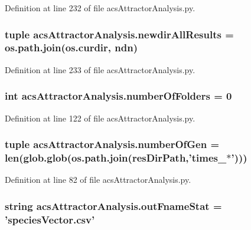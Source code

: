 Definition at line 232 of file acs\-Attractor\-Analysis.\-py.

\hypertarget{a00122_ae620f985669aed90dc070824420d4b5e}{
\subsubsection[{newdir\-All\-Results}]{\setlength{\rightskip}{0pt plus 5cm}tuple acs\-Attractor\-Analysis.\-newdir\-All\-Results = os.\-path.\-join(os.\-curdir, {\bf ndn})}}\label{a00122_ae620f985669aed90dc070824420d4b5e}


Definition at line 233 of file acs\-Attractor\-Analysis.\-py.

\hypertarget{a00122_aa5d2495d08b8ad5ebf34f85d5417e93c}{
\subsubsection[{number\-Of\-Folders}]{\setlength{\rightskip}{0pt plus 5cm}int acs\-Attractor\-Analysis.\-number\-Of\-Folders = 0}}\label{a00122_aa5d2495d08b8ad5ebf34f85d5417e93c}


Definition at line 122 of file acs\-Attractor\-Analysis.\-py.

\hypertarget{a00122_ac014a9b46a060e4fed96eaee9614345b}{
\subsubsection[{number\-Of\-Gen}]{\setlength{\rightskip}{0pt plus 5cm}tuple acs\-Attractor\-Analysis.\-number\-Of\-Gen = len(glob.\-glob(os.\-path.\-join({\bf res\-Dir\-Path},'times\-\_\-$\ast$')))}}\label{a00122_ac014a9b46a060e4fed96eaee9614345b}


Definition at line 82 of file acs\-Attractor\-Analysis.\-py.

\hypertarget{a00122_aeecfcdefbc44b2b2ceff4c9b6f737f27}{
\subsubsection[{out\-Fname\-Stat}]{\setlength{\rightskip}{0pt plus 5cm}string acs\-Attractor\-Analysis.\-out\-Fname\-Stat = 'species\-Vector.\-csv'}}\label{a00122_aeecfcdefbc44b2b2ceff4c9b6f737f27}


